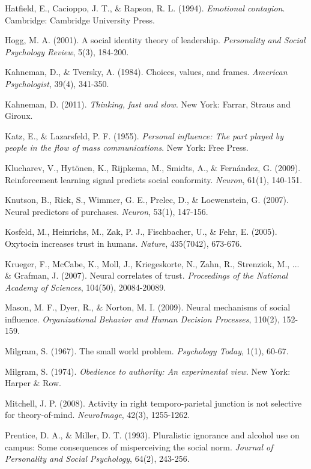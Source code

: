 \documentclass[11pt,a4paper]{article}
\begin{document}
\begin{thebibliography}{99}
Hatfield, E., Cacioppo, J. T., \& Rapson, R. L. (1994). \textit{Emotional contagion}. Cambridge: Cambridge University Press.

Hogg, M. A. (2001). A social identity theory of leadership. \textit{Personality and Social Psychology Review}, 5(3), 184-200.

Kahneman, D., \& Tversky, A. (1984). Choices, values, and frames. \textit{American Psychologist}, 39(4), 341-350.

Kahneman, D. (2011). \textit{Thinking, fast and slow}. New York: Farrar, Straus and Giroux.

Katz, E., \& Lazarsfeld, P. F. (1955). \textit{Personal influence: The part played by people in the flow of mass communications}. New York: Free Press.

Klucharev, V., Hytönen, K., Rijpkema, M., Smidts, A., \& Fernández, G. (2009). Reinforcement learning signal predicts social conformity. \textit{Neuron}, 61(1), 140-151.

Knutson, B., Rick, S., Wimmer, G. E., Prelec, D., \& Loewenstein, G. (2007). Neural predictors of purchases. \textit{Neuron}, 53(1), 147-156.

Kosfeld, M., Heinrichs, M., Zak, P. J., Fischbacher, U., \& Fehr, E. (2005). Oxytocin increases trust in humans. \textit{Nature}, 435(7042), 673-676.

Krueger, F., McCabe, K., Moll, J., Kriegeskorte, N., Zahn, R., Strenziok, M., ... \& Grafman, J. (2007). Neural correlates of trust. \textit{Proceedings of the National Academy of Sciences}, 104(50), 20084-20089.

Mason, M. F., Dyer, R., \& Norton, M. I. (2009). Neural mechanisms of social influence. \textit{Organizational Behavior and Human Decision Processes}, 110(2), 152-159.

Milgram, S. (1967). The small world problem. \textit{Psychology Today}, 1(1), 60-67.

Milgram, S. (1974). \textit{Obedience to authority: An experimental view}. New York: Harper \& Row.

Mitchell, J. P. (2008). Activity in right temporo-parietal junction is not selective for theory-of-mind. \textit{NeuroImage}, 42(3), 1255-1262.

Prentice, D. A., \& Miller, D. T. (1993). Pluralistic ignorance and alcohol use on campus: Some consequences of misperceiving the social norm. \textit{Journal of Personality and Social Psychology}, 64(2), 243-256.


\end{thebibliography}
\end{document}
